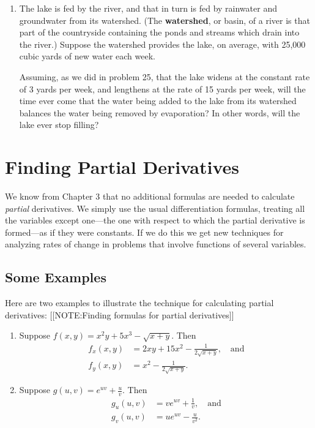 \begin{enumerate}
\item The lake is fed by the river, and that in turn is fed by
rainwater and groundwater from its watershed.  (The {\bf watershed},
or basin, of a river is that part of the countryside containing the
ponds and streams which drain into the river.)  Suppose the watershed
provides the lake, on average, with 25,000 cubic yards of new water
each week.

Assuming, as we did in problem 25, that the lake widens at the
constant rate of 3 yards per week, and lengthens at the rate of 15
yards per week, will the time ever come that the water being added to
the lake from its watershed balances the water being removed by
evaporation?  In other words, will the lake ever stop filling?



\end{enumerate}
\section{Finding Partial Derivatives} 
\label{sec:finding-partial-derivatives}

     We know from  Chapter 3 that no additional formulas are needed to calculate {\em partial\/} derivatives.  We simply use the usual differentiation formulas, treating all the variables except one---the one with respect to which the partial derivative is formed---as if they were constants.  If we do this we get new techniques for analyzing rates of change in problems that involve functions of several variables.

\subsection{Some Examples}
\label{subsec:some-examples}

      Here are two examples to illustrate the technique for calculating partial derivatives:
      [[NOTE:Finding formulas for partial derivatives]]

\begin{enumerate}

\item Suppose $f(x,y) = x^2y + 5x^3 - \sqrt{x+y}$.  Then
\begin{align*}
f_x(x,y) &= 2xy + 15x^2 - \frac{1}{2\sqrt{x+y}}, \quad\mbox{and}\\
f_y(x,y) &= x^2  - \frac{1}{2\sqrt{x+y}}.
\end{align*}

\item Suppose $g(u,v) = e^{\displaystyle uv} + \displaystyle{\frac{u}{v}}$.  Then
\begin{align*}
g_u(u,v) &= ve^{\displaystyle uv} + \frac{1}{v}, \quad\mbox{and}\\[8pt]
g_v(u,v) &= ue^{\displaystyle uv} - \frac{u}{v^2}.
\end{align*}

\end{enumerate}


